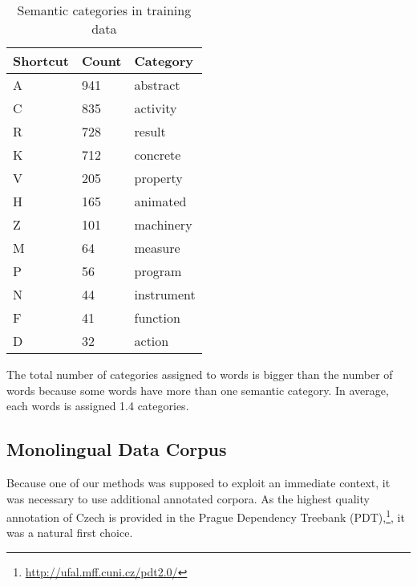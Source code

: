\documentclass[letterpaper]{article}
\begin{document}
\begin{table}
\begin{tabular}{|l|l|l|}
 \hline
\textbf{Shortcut} &  \textbf{Count} & \textbf{Category}\\
\hline
A & 941 & abstract \\ \hline
C & 835 & activity \\ \hline
R & 728 & result \\ \hline
K & 712 & concrete \\ \hline
V & 205 & property \\ \hline
H & 165 & animated \\ \hline
Z & 101 & machinery \\ \hline
M & 64 & measure\\ \hline
P & 56 & program \\ \hline
N & 44 & instrument \\ \hline
F & 41 & function \\ \hline
D & 32 & action \\ \hline

\end{tabular}
\caption{Semantic categories in training data}
\end{table}


The total number of categories assigned to words is bigger than the number of words because some words have more than one semantic category. In average, each words is assigned 1.4 categories.





\subsection{Monolingual Data Corpus}
Because one of our methods was supposed to exploit an immediate context, it was necessary to use additional annotated corpora. As the highest quality annotation of Czech is provided in the Prague Dependency Treebank (PDT),\footnote{\url{http://ufal.mff.cuni.cz/pdt2.0/}}, it was a natural first choice.   
\end{document}
